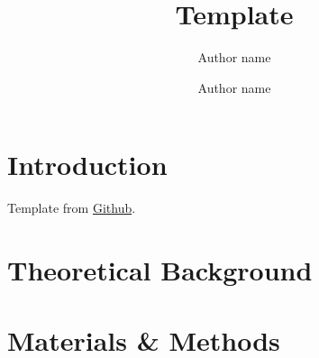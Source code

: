 \documentclass[twocolumn, switch]{article}
\title{Template}
\author[1]{Author name \orcidA{}}
\author[2]{Author name \orcidB{}}
\affil[1]{Department, University}
\affil[2]{Department, University}
\begin{document}




\section{Introduction}
\label{sec:introduction}

Template from  \href{https://github.com/brenhinkeller/preprint-template.tex}{Github}. 

\section{Theoretical Background}
\label{sec:headings}

\lipsum[1]

\section{Materials \& Methods}
\label{sec:others}
\end{document}
